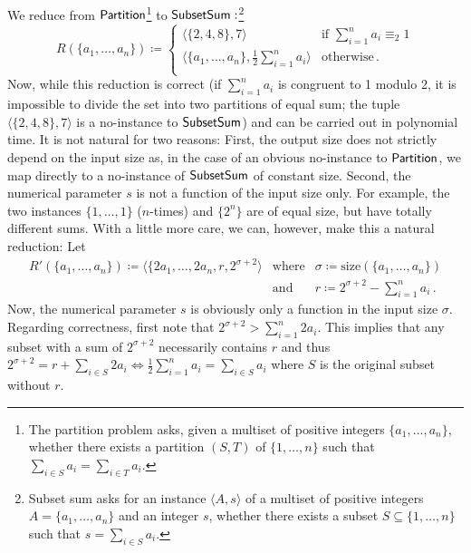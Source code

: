 \documentclass[11pt]{article}
\begin{document}
\begin{example}
  We reduce from
  $\mathsf{Partition}$\footnote{The partition problem asks, given a multiset
  of positive integers $\{a_1, \dots, a_n\}$, whether there exists a partition
  $(S,T)$ of $\{1, \dots, n\}$ such that
  $\sum_{i \in S} a_i = \sum_{i \in T} a_i$.}
  to
  $\mathsf{SubsetSum}:$\footnote{Subset sum asks for an instance
  $\langle A, s \rangle$ of a multiset of positive integers
  $A = \{a_1, \dots, a_n\}$ and an integer $s$, whether there exists a subset
  $S \subseteq \{1, \dots, n\}$ such that
  $s = \sum_{i \in S} a_i$.}
  \[
    R(\{a_1, \dots, a_n\}) \coloneqq
    \left\{
      \begin{array}{ll}
        \langle \{2, 4, 8\}, 7 \rangle
          & \textrm{if } \sum_{i=1}^n a_i \equiv_2 1 \\
        \langle \{a_1, \dots, a_n\}, \frac 1 2 \sum_{i=1}^n a_i \rangle
          & \textrm{otherwise} \,. \\
      \end{array}
    \right.
  \]
  Now, while this reduction is correct (if $\sum_{i=1}^n a_i$ is congruent to 1
  modulo 2, it is impossible to divide the set into two partitions of equal sum;
  the tuple $\langle \{2, 4, 8\}, 7 \rangle$ is a no-instance to
  $\mathsf{SubsetSum}$) and can be carried out in polynomial time.
  It is not natural for two reasons:
  First, the output size does not strictly depend on the input size as, in the
  case of an obvious no-instance to $\mathsf{Partition}$, we map directly to a
  no-instance of $\mathsf{SubsetSum}$ of constant size.
  Second, the numerical parameter $s$ is not a function of the input
  size only. For example, the two instances $\{1, \dots, 1\}$ ($n$-times) and
  $\{2^n\}$ are of equal size, but have totally different sums.
  With a little more care, we can, however, make this a natural reduction: Let
  \[
    \begin{array}{rrl}
      R'(\{a_1, \dots, a_n\}) \coloneqq
        \langle \{2 a_1, \dots, 2 a_n, r,
         2^{\sigma+2} \rangle
      &\textrm{where}&
      \sigma \coloneqq \mathrm{size}(\{a_1, \dots, a_n\}) \\
      &\textrm{and}&
      r \coloneqq 2^{\sigma+2} - \sum_{i=1}^n a_i \,.
    \end{array}
  \]
  Now, the numerical parameter $s$ is obviously only a function in the input
  size $\sigma$. Regarding correctness, first note that
  $2^{\sigma+2} > \sum_{i=1}^n 2 a_i$. This implies that any subset with a sum
  of $2^{\sigma+2}$ necessarily contains $r$ and thus
  $
    \textstyle
    2^{\sigma+2} = r + \sum_{i \in S} 2a_i
    \iff
    \frac 1 2 \sum_{i=1}^n a_i = \sum_{i \in S} a_i
  $
  where $S$ is the original subset without $r$.
\end{example}
\end{document}

